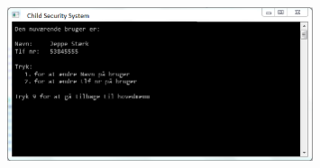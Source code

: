 \begin{figure}[h] \centering
{\includegraphics[width=0.8\textwidth]{billeder/cmdprompt/CSS_advisering}}
\caption{}
\label{fig:CSS Advisering}
\end{figure}



